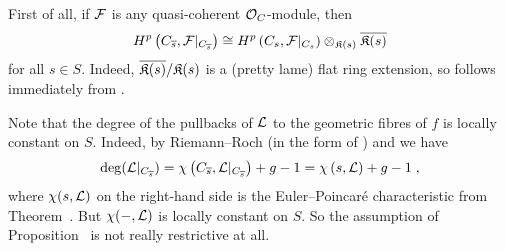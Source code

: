 \documentclass[a4paper,parskip=half,numbers=enddot, DIV=12]{scrreprt}
\begin{document}
\begin{rem}
	\begin{alphanumerate}
		\item {}First of all, if $\mathcal{F}$ is any quasi-coherent $\mathcal{O}_C$-module, then
		\begin{align}\lbl{eq:GeometricFibreIso}
		H^p\left(C_{\ov{s}},\Ff|_{C_{\ov{s}}}\right)\cong H^p\left(C_s,\Ff|_{C_s}\right)\otimes_{\KK(s)}\ov{\KK(s)}
		\end{align}
		for all $s\in S$. Indeed, $\overline{\mathfrak{K}(s)}/\mathfrak{K}(s)$ is a (pretty lame) flat ring extension, so  follows immediately from .
		\item Note that the degree of the pullbacks of $\mathcal{L}$ to the geometric fibres of $f$ is locally constant on $S$. Indeed, by Riemann--Roch (in the form of \cite[Theorem~8]{alggeo2}) and  we have
		\begin{align*}
			\deg(\mathcal{L}|_{C_{\overline{s}}})=\chi\left(C_{\overline{s}},\mathcal{L}|_{C_{\overline{s}}}\right)+g-1=\chi\left(s,\mathcal{L}\right)+g-1\;,
		\end{align*}
		where $\chi(s,\mathcal{L})$ on the right-hand side is the Euler--Poincaré characteristic from Theorem~. But $\chi(-,\mathcal{L})$ is locally constant on $S$. So the assumption of Proposition~ is not really restrictive at all.
	\end{alphanumerate}
\end{rem}
\end{document}
